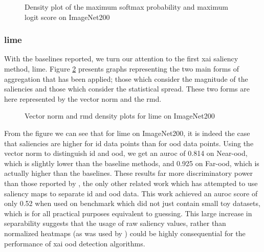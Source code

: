 \documentclass[UKenglish]{uiomasterthesis} %
\theoremstyle{definition}
\begin{document}
\begin{figure}[H]
    \begin{center}
        
    \end{center}
    \caption{Density plot of the maximum softmax probability and maximum logit score on ImageNet200}
    \label{fig:imagenet200logits}
\end{figure}

\subsubsection{\ac{lime}}

With the baselines reported, we turn our attention to the first \ac{xai} saliency method, \ac{lime}. Figure \ref{fig:imagenet200limemeangini} presents graphs representing the two main forms of aggregation that has been applied; those which consider the magnitude of the saliencies and those which consider the statistical spread. These two forms are here represented by the vector norm and the \ac{rmd}.

\begin{figure}[H]
    \begin{center}
        
    \end{center}
    \caption{Vector norm and \acs*{rmd} density plots for \acs*{lime} on ImageNet200}
    \label{fig:imagenet200limemeangini}
\end{figure}

From the figure we can see that for \ac{lime} on ImageNet200, it is indeed the case that saliencies are higher for \ac{id} data points than for \ac{ood} data points. Using the vector norm to distinguish \ac{id} and \ac{ood}, we get an \ac{auroc} of 0.814 on Near-\ac{ood}, which is slightly lower than the baseline methods, and 0.925 on Far-\ac{ood}, which is actually higher than the baselines. These results far more discriminatory power than those reported by \cite{martinez}, the only other related work which has attempted to use saliency maps to separate \ac{id} and \ac{ood} data. This work achieved an \ac{auroc} score of only 0.52 when used on benchmark which did not just contain small toy datasets, which is for all practical purposes equivalent to guessing. This large increase in separability suggests that the usage of raw saliency values, rather than normalized heatmaps (as was used by \cite{martinez}) could be highly consequential for the performance of \ac{xai} \ac{ood} detection algorithms.
\end{document}
